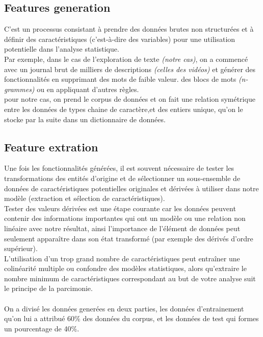 \subsection{Features generation}
C'est un processus consistant à prendre des données brutes non structurées et à définir des caractéristiques (c'est-à-dire des variables) pour une utilisation potentielle dans l'analyse statistique.\\
 Par exemple, dans le cas de l'exploration de texte \textit{(notre cas)}, on a  commencé avec un journal brut de milliers de descriptions \textit{(celles des vidéos)} et générer des fonctionnalités en supprimant des mots de faible valeur. des blocs de mots \textit{(n-grammes)} ou en appliquant d'autres règles.\\[0.5cm]
pour notre cas, on prend le corpus de données et on fait une relation symétrique entre les données de types chaine de caractère,et des entiers unique, qu'on le stocke par la suite dans un dictionnaire de données.
\subsection{Feature extration}
Une fois les fonctionnalités générées, il est souvent nécessaire de tester les transformations des entités d'origine et de sélectionner un sous-ensemble de données de caractéristiques potentielles originales et dérivées à utiliser dans notre modèle (extraction et sélection de caractéristiques).\\[0.2cm]
Tester des valeurs dérivées est une étape courante car les données peuvent contenir des informations importantes qui ont un modèle ou une relation non linéaire avec notre résultat, ainsi l'importance de l'élément de données peut seulement apparaître dans son état transformé (par exemple des dérivés d'ordre supérieur).\\[0.2cm]
 L'utilisation d'un trop grand nombre de caractéristiques peut entraîner une colinéarité multiple ou confondre des modèles statistiques, alors qu'extraire le nombre minimum de caractéristiques correspondant au but de votre analyse suit le principe de la parcimonie.\\[0.2cm]
\\On a divisé les données generées en deux parties, les données d'entrainement qu'on lui a attribué 60\% des données du corpus, et les données de test qui formes un pourcentage de 40\%. 







